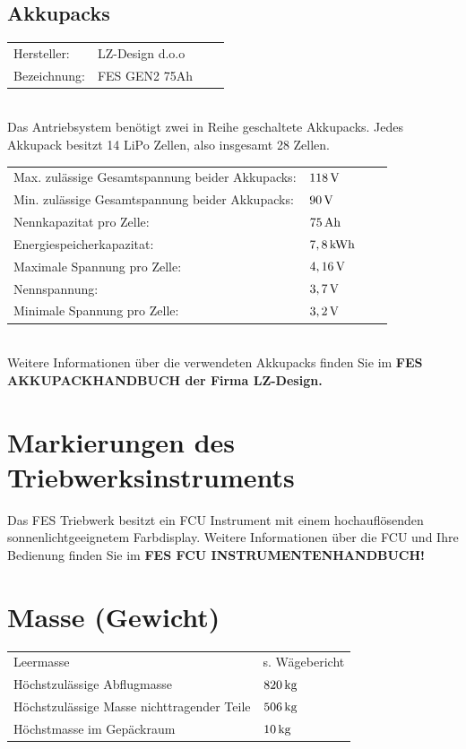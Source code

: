 \subsection{Akkupacks}
\begin{tabular}{p{}p{}ll}
Hersteller: & LZ-Design d.o.o \\
Bezeichnung:& FES GEN2 75Ah \\
\end{tabular}\\

\vspace{0.2cm}
Das Antriebsystem benötigt zwei in Reihe geschaltete Akkupacks. Jedes Akkupack besitzt 14 LiPo Zellen, also insgesamt 28 Zellen.\\

\begin{tabular}{p{}p{}ll}
Max. zulässige Gesamtspannung beider Akkupacks: & $\unit[118]{V}$ \\
Min. zulässige Gesamtspannung beider Akkupacks: & $\unit[90]{V}$ \\
Nennkapazitat pro Zelle: & $\unit[75]{Ah}$ \\
Energiespeicherkapazitat: & $\unit[7,8]{kWh}$ \\
Maximale Spannung pro Zelle: & $\unit[4,16]{V}$ \\
Nennspannung: & $\unit[3,7]{V}$ \\
Minimale Spannung pro Zelle: & $\unit[3,2]{V}$ \\
\end{tabular}\\

\vspace{0.5cm}
Weitere Informationen über die verwendeten Akkupacks finden Sie im \textbf{FES AKKUPACKHANDBUCH der Firma LZ-Design.}

\section{Markierungen des Triebwerksinstruments}
Das FES Triebwerk besitzt ein FCU Instrument mit einem hochauflösenden
sonnenlichtgeeignetem Farbdisplay. Weitere Informationen über die FCU und Ihre
Bedienung finden Sie im \textbf{FES FCU INSTRUMENTENHANDBUCH!}

\section{Masse (Gewicht)}
\begin{tabular}{l l}
Leermasse & s. Wägebericht\\
Höchstzulässige Abflugmasse & $\unit[820]{kg}$\\
Höchstzulässige Masse nichttragender Teile & $\unit[506]{kg}$ \\
Höchstmasse im Gepäckraum & $\unit[10]{kg}$ \\
\end{tabular}\\

